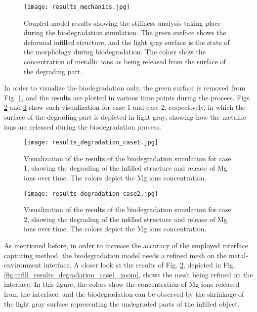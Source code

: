 \begin{figure}[h]
\centering
\medskip
\texttt{[image: results\_mechanics.jpg]}
\caption[Coupled model results showing the stiffness analysis taking place during biodegradation simulation]{Coupled model results showing the stiffness analysis taking place during the biodegradation simulation. The green surface shows the deformed infilled structure, and the light gray surface is the state of the morphology during biodegradation. The colors show the concentration of metallic ions as being released from the surface of the degrading part.} \label{fig:infill_results_mechanics}
\end{figure}

In order to visualize the biodegradation only, the green surface is removed from Fig. \ref{fig:infill_results_mechanics}, and the results are plotted in various time points during the process. Figs. \ref{fig:infill_results_degradation_case1} and \ref{fig:infill_results_degradation_case2} show such visualization for case 1 and case 2, respectively, in which the surface of the degrading part is depicted in light gray, showing how the metallic ions are released during the biodegradation process. 

\begin{figure}[h]
\centering
\medskip
\texttt{[image: results\_degradation\_case1.jpg]}
\caption[Visualization of the results of the biodegradation simulation for case 1]{Visualization of the results of the biodegradation simulation for case 1, showing the degrading of the infilled structure and release of Mg ions over time. The colors depict the Mg ions concentration.} \label{fig:infill_results_degradation_case1}
\end{figure}


\begin{figure}[h]
\centering
\medskip
\texttt{[image: results\_degradation\_case2.jpg]}
\caption[Visualization of the results of the biodegradation simulation for case 2]{Visualization of the results of the biodegradation simulation for case 2, showing the degrading of the infilled structure and release of Mg ions over time. The colors depict the Mg ions concentration.} \label{fig:infill_results_degradation_case2}
\end{figure}

As mentioned before, in order to increase the accuracy of the employed interface capturing method, the biodegradation model needs a refined mesh on the metal-environment interface. A closer look at the results of Fig. \ref{fig:infill_results_degradation_case1}, depicted in Fig. \ref{fig:infill_results_degradation_case1_zoom}, shows the mesh being refined on the interface. In this figure, the colors show the concentration of Mg ions released from the interface, and the biodegradation can be observed by the shrinkage of the light gray surface representing the undegraded parts of the infilled object.


